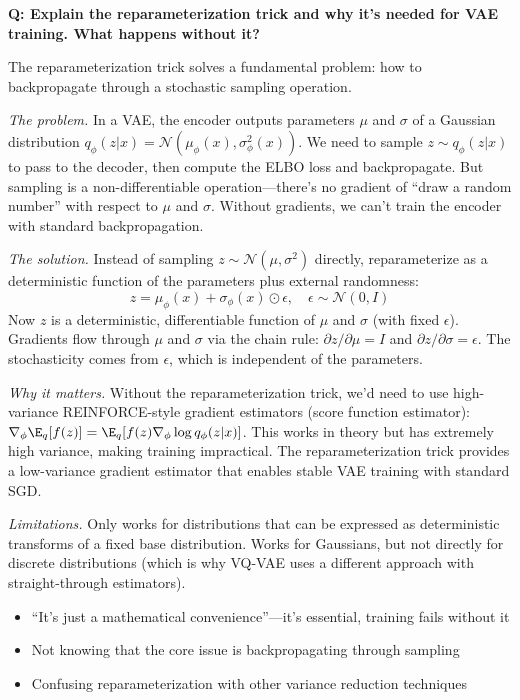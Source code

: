 \begin{interviewq}
\textbf{Q: Explain the reparameterization trick and why it's needed for VAE training. What happens without it?}

 \quad {} \quad \badgefreq{\freqhigh}

\stronganswer The reparameterization trick solves a fundamental problem: how to backpropagate through a stochastic sampling operation.

\textit{The problem.} In a VAE, the encoder outputs parameters $\mu$ and $\sigma$ of a Gaussian distribution $q_\phi(z|x) = \mathcal{N}(\mu_\phi(x), \sigma_\phi^2(x))$. We need to sample $z \sim q_\phi(z|x)$ to pass to the decoder, then compute the ELBO loss and backpropagate. But sampling is a non-differentiable operation---there's no gradient of ``draw a random number'' with respect to $\mu$ and $\sigma$. Without gradients, we can't train the encoder with standard backpropagation.

\textit{The solution.} Instead of sampling $z \sim \mathcal{N}(\mu, \sigma^2)$ directly, reparameterize as a deterministic function of the parameters plus external randomness:
$$z = \mu_\phi(x) + \sigma_\phi(x) \odot \epsilon, \quad \epsilon \sim \mathcal{N}(0, I)$$
Now $z$ is a deterministic, differentiable function of $\mu$ and $\sigma$ (with fixed $\epsilon$). Gradients flow through $\mu$ and $\sigma$ via the chain rule: $\partial z / \partial \mu = I$ and $\partial z / \partial \sigma = \epsilon$. The stochasticity comes from $\epsilon$, which is independent of the parameters.

\textit{Why it matters.} Without the reparameterization trick, we'd need to use high-variance REINFORCE-style gradient estimators (score function estimator): $\nabla_\phi \E_q[f(z)] = \E_q[f(z) \nabla_\phi \log q_\phi(z|x)]$. This works in theory but has extremely high variance, making training impractical. The reparameterization trick provides a low-variance gradient estimator that enables stable VAE training with standard SGD.

\textit{Limitations.} Only works for distributions that can be expressed as deterministic transforms of a fixed base distribution. Works for Gaussians, but not directly for discrete distributions (which is why VQ-VAE uses a different approach with straight-through estimators).

\redflags
\begin{itemize}
    \item ``It's just a mathematical convenience''---it's essential, training fails without it
    \item Not knowing that the core issue is backpropagating through sampling
    \item Confusing reparameterization with other variance reduction techniques
\end{itemize}


\end{interviewq}
